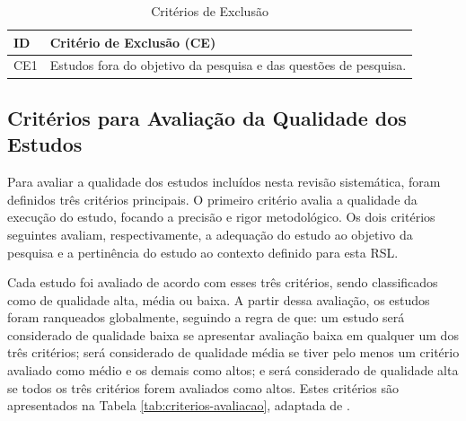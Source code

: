 \begin{table}[h]
\caption{Critérios de Exclusão}
\label{tab:criterios-exclusao}
\begin{tabular}{p{1.5cm}p{11cm}}
\hline
\textbf{ID} & \textbf{Critério de Exclusão (CE)} \\
\hline
CE1 & Estudos fora do objetivo da pesquisa e das questões de pesquisa. \\
\hline
\end{tabular}
\end{table}

\subsection{Critérios para Avaliação da Qualidade dos Estudos}
\label{subsec:criterios-qualidade}

Para avaliar a qualidade dos estudos incluídos nesta revisão sistemática, foram definidos três
critérios principais. O primeiro critério avalia a qualidade da execução do estudo, focando a precisão
e rigor metodológico. Os dois critérios seguintes avaliam, respectivamente, a adequação do estudo ao
objetivo da pesquisa e a pertinência do estudo ao contexto definido para esta RSL.

Cada estudo foi avaliado de acordo com esses três critérios, sendo classificados como de
qualidade alta, média ou baixa. A partir dessa avaliação, os estudos foram ranqueados globalmente,
seguindo a regra de que: um estudo será considerado de qualidade baixa se apresentar avaliação
baixa em qualquer um dos três critérios; será considerado de qualidade média se tiver pelo menos
um critério avaliado como médio e os demais como altos; e será considerado de qualidade alta se
todos os três critérios forem avaliados como altos. Estes critérios são apresentados na Tabela
\ref{tab:criterios-avaliacao}, adaptada de \citeauthor{lopes2023} \citeyear{lopes2023}.

